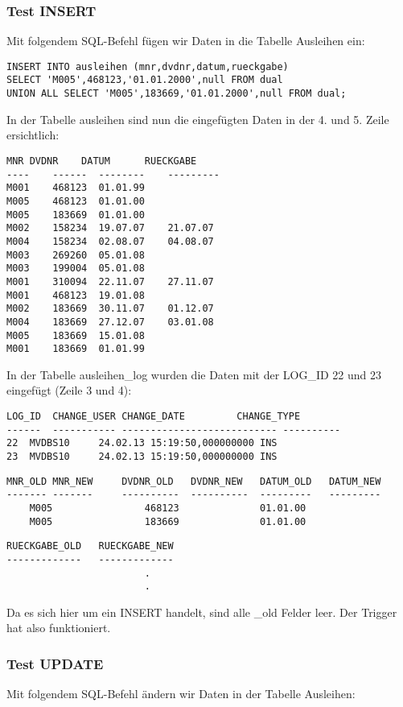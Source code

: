 \documentclass[11pt,a4paper,parskip=half]{scrartcl}
\begin{document}
\subsubsection{Test INSERT}

Mit folgendem SQL-Befehl fügen wir Daten in die Tabelle Ausleihen ein:

\begin{lstlisting}
INSERT INTO ausleihen (mnr,dvdnr,datum,rueckgabe) 
SELECT 'M005',468123,'01.01.2000',null FROM dual
UNION ALL SELECT 'M005',183669,'01.01.2000',null FROM dual;
\end{lstlisting}

In der Tabelle ausleihen sind nun die eingefügten Daten in der 4. und 5. Zeile ersichtlich:

\begin{lstlisting}
MNR	DVDNR	 DATUM		RUECKGABE
---- 	------	-------- 	---------
M001	468123 	01.01.99	
M005	468123	01.01.00	
M005	183669	01.01.00	
M002	158234 	19.07.07	21.07.07  
M004	158234 	02.08.07	04.08.07  
M003	269260 	05.01.08	
M003	199004 	05.01.08	
M001	310094 	22.11.07	27.11.07  
M001	468123 	19.01.08	
M002	183669 	30.11.07	01.12.07  
M004	183669 	27.12.07	03.01.08  
M005	183669 	15.01.08	
M001	183669	01.01.99	
\end{lstlisting}

In der Tabelle ausleihen\_log wurden die Daten mit der LOG\_ID 22 und 23 eingefügt (Zeile 3 und 4):

\begin{lstlisting}
LOG_ID	CHANGE_USER	CHANGE_DATE			CHANGE_TYPE	
------	-----------	---------------------------	----------		
22	MVDBS10		24.02.13 15:19:50,000000000	INS					
23	MVDBS10		24.02.13 15:19:50,000000000	INS					
\end{lstlisting}

\begin{lstlisting}
MNR_OLD	MNR_NEW		DVDNR_OLD	DVDNR_NEW	DATUM_OLD	DATUM_NEW	
-------	-------		----------	----------	---------	--------- 	
	M005				468123				01.01.00					
	M005				183669				01.01.00					
\end{lstlisting}
\begin{lstlisting}
RUECKGABE_OLD	RUECKGABE_NEW
-------------	-------------	
						.
						.
\end{lstlisting}

Da es sich hier um ein INSERT handelt, sind alle \_old Felder leer. Der Trigger hat also funktioniert.

\subsubsection{Test UPDATE}
Mit folgendem SQL-Befehl ändern wir Daten in der Tabelle Ausleihen:
\end{document}
